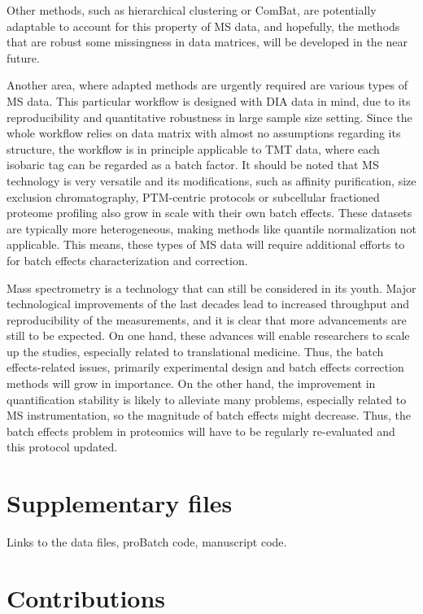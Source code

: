 \documentclass[num-refs]{wiley-article}
\begin{document}
Other methods, such as hierarchical clustering or ComBat, are potentially adaptable to account for this property of MS data, and hopefully, the methods that are robust some missingness in data matrices, will be developed in the near future.

Another area, where adapted methods are urgently required are various types of MS data. This particular workflow is designed with  DIA data in mind, due to its reproducibility and quantitative robustness in large sample size setting. Since the whole workflow relies on data matrix with almost no assumptions regarding its structure, the workflow is in principle applicable to TMT data, where each isobaric tag can be regarded as a batch factor. It should be noted that MS technology is very versatile and its modifications, such as affinity purification, size exclusion chromatography, PTM-centric protocols or subcellular fractioned proteome profiling also grow in scale with their own batch effects. These datasets are typically more heterogeneous, making methods like quantile normalization not applicable. This means, these types of MS data will require additional efforts to for batch effects characterization and correction.

Mass spectrometry is a technology that can still be considered in its youth. Major technological improvements of the last decades lead to increased throughput and reproducibility of the measurements, and it is clear that more advancements are still to be expected. On one hand, these advances will enable researchers to scale up the studies, especially related to translational medicine. Thus, the batch effects-related issues, primarily experimental design and batch effects correction methods will grow in importance. On the other hand, the improvement in quantification stability is likely to alleviate many problems, especially related to MS instrumentation, so the magnitude of batch effects might decrease. Thus, the batch effects problem in proteomics will have to be regularly re-evaluated and this protocol updated.





\section*{Supplementary files}
Links to the data files, proBatch code, manuscript code.

\section*{Contributions}
\end{document}
